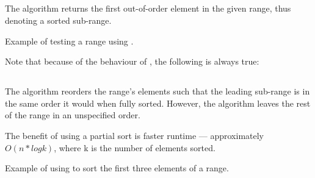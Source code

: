 \subsection{\texorpdfstring{}{\texttt{std::is\_sorted\_until}}}

The  algorithm returns the first out-of-order element in the given range, thus denoting a sorted sub-range.


\begin{codebox}[]{\href{https://compiler-explorer.com/z/1dvboE6b1}{\ExternalLink}}
\footnotesize Example of testing a range using .
\tcblower
{}
\end{codebox}

Note that because of the behaviour of , the following is always true:\\
\begin{small}\end{small}

\subsection{\texorpdfstring{}{\texttt{std::partial\_sort}}}

The  algorithm reorders the range's elements such that the leading sub-range is in the same order it would when fully sorted. However, the algorithm leaves the rest of the range in an unspecified order.



The benefit of using a partial sort is faster runtime — approximately $O(n*logk)$, where k is the number of elements sorted.

\begin{codebox}[]{\href{https://compiler-explorer.com/z/j6xjM4GnT}{\ExternalLink}}
\footnotesize Example of using  to sort the first three elements of a range.
\tcblower
{}
\end{codebox}

